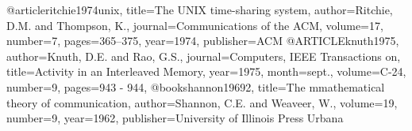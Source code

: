 @article{ritchie1974unix,
title={The UNIX time-sharing system},
author={Ritchie, D.M. and Thompson, K.},
journal={Communications of the ACM},
volume={17},
number={7},
pages={365--375},
year={1974},
publisher={ACM}
}
@ARTICLE{knuth1975,
author={Knuth, D.E. and Rao, G.S.},
journal={Computers, IEEE Transactions on},
title={Activity in an Interleaved Memory},
year={1975},
month={sept.},
volume={C-24},
number={9},
pages={943 - 944},
}
@book{shannon19692,
title={The mmathematical theory of communication},
author={Shannon, C.E. and Weaveer, W.},
volume={19},
number={9},
year={1962},
publisher={University of Illinois Press Urbana}
}
